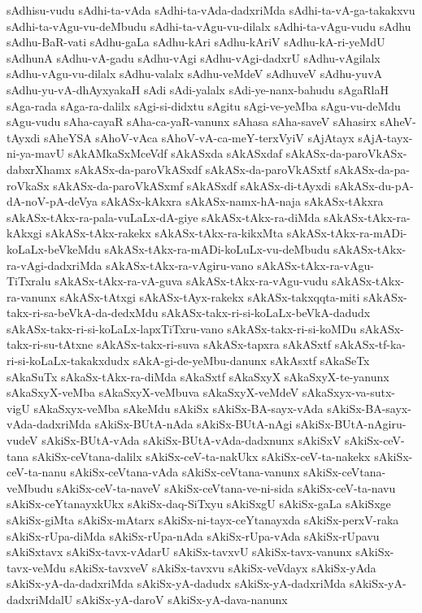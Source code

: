 {sAdhisu-vudu
sAdhi-ta-vAda
sAdhi-ta-vAda-dadxriMda
sAdhi-ta-vA-ga-takakxvu
sAdhi-ta-vAgu-vu-deMbudu
sAdhi-ta-vAgu-vu-dilalx
sAdhi-ta-vAgu-vudu
sAdhu
sAdhu-BaR-vati
sAdhu-gaLa
sAdhu-kAri
sAdhu-kAriV
sAdhu-kA-ri-yeMdU
sAdhunA
sAdhu-vA-gadu
sAdhu-vAgi
sAdhu-vAgi-dadxrU
sAdhu-vAgilalx
sAdhu-vAgu-vu-dilalx
sAdhu-valalx
sAdhu-veMdeV
sAdhuveV
sAdhu-yuvA
sAdhu-yu-vA-dhAyxyakaH
sAdi
sAdi-yalalx
sAdi-ye-nanx-bahudu
sAgaRlaH
sAga-rada
sAga-ra-dalilx
sAgi-si-didxtu
sAgitu
sAgi-ve-yeMba
sAgu-vu-deMdu
sAgu-vudu
sAha-cayaR
sAha-ca-yaR-vanunx
sAhasa
sAha-saveV
sAhasirx
sAheV-tAyxdi
sAheYSA
sAhoV-vAca
sAhoV-vA-ca-meY-terxVyiV
sAjAtayx
sAjA-tayx-ni-ya-mavU
sAkAMkaSxMceVdf
sAkASxda
sAkASxdaf
sAkASx-da-paroVkASx-dabxrXhamx
sAkASx-da-paroVkASxdf
sAkASx-da-paroVkASxtf
sAkASx-da-pa-roVkaSx
sAkASx-da-paroVkASxmf
sAkASxdf
sAkASx-di-tAyxdi
sAkASx-du-pA-dA-noV-pA-deVya
sAkASx-kAkxra
sAkASx-namx-hA-naja
sAkASx-tAkxra
sAkASx-tAkx-ra-pala-vuLaLx-dA-giye
sAkASx-tAkx-ra-diMda
sAkASx-tAkx-ra-kAkxgi
sAkASx-tAkx-rakekx
sAkASx-tAkx-ra-kikxMta
sAkASx-tAkx-ra-mADi-koLaLx-beVkeMdu
sAkASx-tAkx-ra-mADi-koLuLx-vu-deMbudu
sAkASx-tAkx-ra-vAgi-dadxriMda
sAkASx-tAkx-ra-vAgiru-vano
sAkASx-tAkx-ra-vAgu-TiTxralu
sAkASx-tAkx-ra-vA-guva
sAkASx-tAkx-ra-vAgu-vudu
sAkASx-tAkx-ra-vanunx
sAkASx-tAtxgi
sAkASx-tAyx-rakekx
sAkASx-takxqqta-miti
sAkASx-takx-ri-sa-beVkA-da-dedxMdu
sAkASx-takx-ri-si-koLaLx-beVkA-dadudx
sAkASx-takx-ri-si-koLaLx-lapxTiTxru-vano
sAkASx-takx-ri-si-koMDu
sAkASx-takx-ri-su-tAtxne
sAkASx-takx-ri-suva
sAkASx-tapxra
sAkASxtf
sAkASx-tf-ka-ri-si-koLaLx-takakxdudx
sAkA-gi-de-yeMbu-danunx
sAkAsxtf
sAkaSeTx
sAkaSuTx
sAkaSx-tAkx-ra-diMda
sAkaSxtf
sAkaSxyX
sAkaSxyX-te-yanunx
sAkaSxyX-veMba
sAkaSxyX-veMbuva
sAkaSxyX-veMdeV
sAkaSxyx-va-sutx-vigU
sAkaSxyx-veMba
sAkeMdu
sAkiSx
sAkiSx-BA-sayx-vAda
sAkiSx-BA-sayx-vAda-dadxriMda
sAkiSx-BUtA-nAda
sAkiSx-BUtA-nAgi
sAkiSx-BUtA-nAgiru-vudeV
sAkiSx-BUtA-vAda
sAkiSx-BUtA-vAda-dadxnunx
sAkiSxV
sAkiSx-ceV-tana
sAkiSx-ceVtana-dalilx
sAkiSx-ceV-ta-nakUkx
sAkiSx-ceV-ta-nakekx
sAkiSx-ceV-ta-nanu
sAkiSx-ceVtana-vAda
sAkiSx-ceVtana-vanunx
sAkiSx-ceVtana-veMbudu
sAkiSx-ceV-ta-naveV
sAkiSx-ceVtana-ve-ni-sida
sAkiSx-ceV-ta-navu
sAkiSx-ceYtanayxkUkx
sAkiSx-daq-SiTxyu
sAkiSxgU
sAkiSx-gaLa
sAkiSxge
sAkiSx-giMta
sAkiSx-mAtarx
sAkiSx-ni-tayx-ceYtanayxda
sAkiSx-perxV-raka
sAkiSx-rUpa-diMda
sAkiSx-rUpa-nAda
sAkiSx-rUpa-vAda
sAkiSx-rUpavu
sAkiSxtavx
sAkiSx-tavx-vAdarU
sAkiSx-tavxvU
sAkiSx-tavx-vanunx
sAkiSx-tavx-veMdu
sAkiSx-tavxveV
sAkiSx-tavxvu
sAkiSx-veVdayx
sAkiSx-yAda
sAkiSx-yA-da-dadxriMda
sAkiSx-yA-dadudx
sAkiSx-yA-dadxriMda
sAkiSx-yA-dadxriMdalU
sAkiSx-yA-daroV
sAkiSx-yA-dava-nanunx
}
